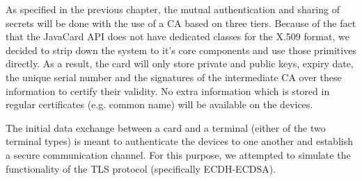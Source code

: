 As specified in the previous chapter, the mutual authentication and sharing of secrets will be done with the use of a CA based on three tiers. Because of the fact that the JavaCard API does not have dedicated classes for the X.509 format, we decided to strip down the system to it's core components and use those primitives directly. As a result, the card will only store private and public keys, expiry date, the unique serial number and the signatures of the intermediate CA over these information to certify their validity. No extra information which is stored in regular certificates (e.g. common name) will be available on the devices.

The initial data exchange between a card and a terminal (either of the two terminal types) is meant to authenticate the devices to one another and establish a secure communication channel. For this purpose, we attempted to simulate the functionality of the TLS protocol (specifically ECDH-ECDSA). 

